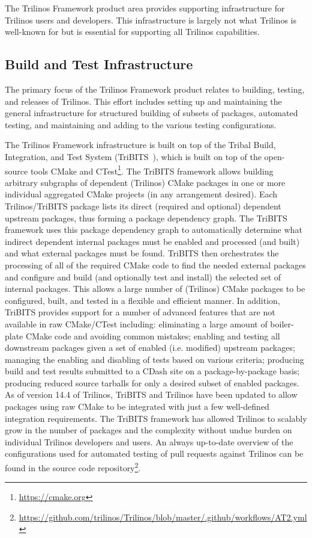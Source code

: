 
The Trilinos Framework product area provides supporting infrastructure for Trilinos users and developers. This infrastructure is largely not what Trilinos is well-known for but is essential for supporting all Trilinos capabilities.

\subsection{Build and Test Infrastructure}

The primary focus of the Trilinos Framework product relates to building, testing, and releases of Trilinos. This effort includes setting up and maintaining the general infrastructure for structured building of subsets of packages, automated testing, and maintaining and adding to the various testing configurations.

The Trilinos Framework infrastructure is built on top of the Tribal Build, Integration, and Test System (TriBITS~\cite{Bartlett2014}), which is built on top of the open-source tools CMake and CTest\footnote{\url{https://cmake.org}}.
The TriBITS framework allows building arbitrary subgraphs of dependent (Trilinos) CMake packages in one or more individual aggregated CMake projects (in any arrangement desired).
Each Trilinos/TriBITS package lists its direct (required and optional) dependent upstream packages, thus forming a package dependency graph.
The TriBITS framework uses this package dependency graph to automatically determine what indirect dependent internal packages must be enabled and processed (and built) and what external packages must be found.
TriBITS then orchestrates the processing of all of the required CMake code to find the needed external packages and configure and build (and optionally test and install) the selected set of internal packages.
This allows a large number of (Trilinos) CMake packages to be configured, built, and tested in a flexible and efficient manner.
In addition, TriBITS provides support for a number of advanced features that are not available in raw CMake/CTest including: eliminating a large amount of boiler-plate CMake code and avoiding common mistakes; enabling and testing all downstream packages given a set of enabled (i.e. modified) upstream packages; managing the enabling and disabling of tests based on various criteria; producing build and test results submitted to a CDash site on a package-by-package basis; producing reduced source tarballs for only a desired subset of enabled packages.
As of version 14.4 of Trilinos, TriBITS and Trilinos have been updated to allow packages using raw CMake to be integrated with just a few well-defined integration requirements. The TriBITS framework has allowed Trilinos to scalably grow in the number of packages and the complexity without undue burden on individual Trilinos developers and users.
An always up-to-date overview of the configurations used for automated testing of pull requests against Trilinos can be found in the source code repository\footnote{\url{https://github.com/trilinos/Trilinos/blob/master/.github/workflows/AT2.yml}}.

